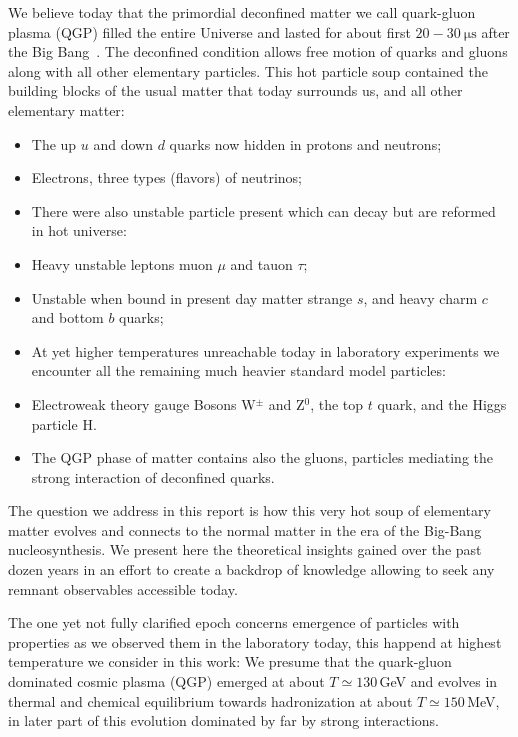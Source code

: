 We believe today that the primordial deconfined matter we call quark-gluon plasma (QGP) filled the entire Universe and lasted for about first $20-30\ \mathrm{\mu s}$ after the Big Bang~\cite{Letessier:2002ony}. The deconfined condition allows free motion of quarks and gluons along with all other elementary particles. This hot particle soup contained the building blocks of the usual matter that today surrounds us, and all other elementary matter:
\begin{itemize}
\item The up $u$ and down $d$ quarks now hidden in protons and neutrons;
\item Electrons, three types (flavors) of neutrinos;
\item[] There were also unstable particle present which can decay but are reformed in hot universe:
\item Heavy unstable leptons muon $\mu$ and tauon $\tau$;
\item Unstable when bound in present day matter strange $s$, and heavy charm $c$ and bottom $b$ quarks;
\item[] At yet higher temperatures unreachable today in laboratory experiments we encounter all the remaining much heavier standard model particles: 
\item Electroweak theory gauge Bosons W$^\pm$ and Z$^0$, the top $t$ quark, and the Higgs particle H.
\item The QGP phase of matter contains also the gluons, particles mediating the strong interaction of deconfined quarks.
\end{itemize}

The question we address in this report is how this very hot soup of elementary matter evolves and connects to the normal matter in the era of the Big-Bang nucleosynthesis. We present here the theoretical insights gained over the past dozen years in an effort to create a backdrop of knowledge allowing to seek any remnant observables accessible today.

The one yet not fully clarified epoch concerns emergence of particles with properties as we observed them in the laboratory today, this happend at highest temperature we consider in this work: We presume that the quark-gluon dominated cosmic plasma (QGP) emerged at about $T\simeq 130$\,GeV and evolves in thermal and chemical equilibrium towards hadronization at about $T\simeq150$\,MeV, in later part of this evolution dominated by far by strong interactions. 

